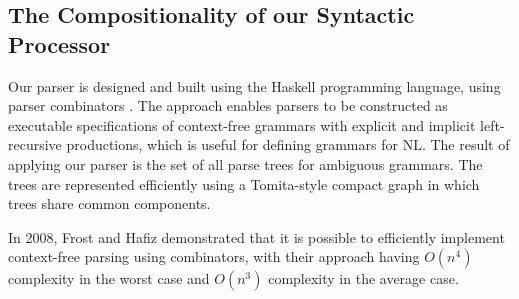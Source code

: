 \documentclass[../main.tex]{subfiles}
\begin{document}
\begin{refsection}
\subsection{The Compositionality of our Syntactic Processor}
\label{webist2019journal:compositionality-syntax}

Our parser is designed and built using the Haskell programming language, using parser combinators \cite{frost2008parser}. The approach enables parsers to be constructed as executable specifications of context-free grammars with explicit and implicit left-recursive productions, which is useful for defining grammars for NL. The result of applying our parser is the set of all parse trees for ambiguous grammars. The trees are represented efficiently using a Tomita-style \cite{tomita1985} compact graph in which trees share common components.

\noindent In 2008, Frost and Hafiz \cite{frosthafiz2008} demonstrated that it is possible to efficiently implement context-free parsing using combinators, with their approach having $O(n^4)$ complexity in the worst case and $O(n^3)$ complexity in the average case.


\end{refsection}
\end{document}
